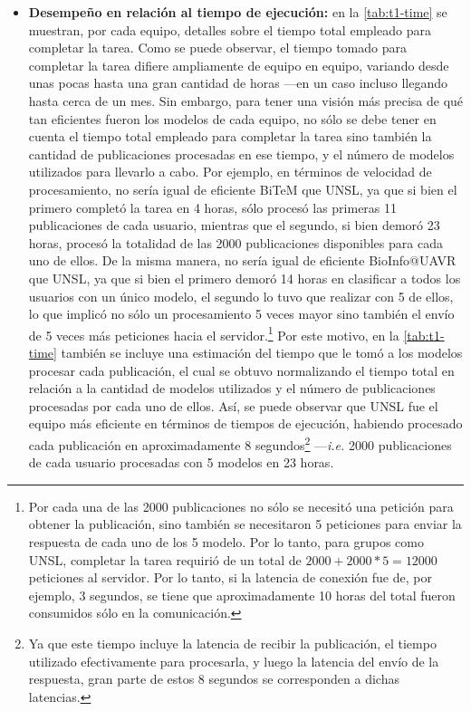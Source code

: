 \begin{itemize}
\begin{table}[t!]
\begin{tabular}{l c c|c | c}
\hline
\end{tabular}
\end{table}

    \item \textbf{Desempeño en relación al tiempo de ejecución:} en la \autoref{tab:t1-time} se muestran, por cada equipo, detalles sobre el tiempo total empleado para completar la tarea.
    Como se puede observar, el tiempo tomado para completar la tarea difiere ampliamente de equipo en equipo, variando desde unas pocas hasta una gran cantidad de horas ---en un caso incluso llegando hasta cerca de un mes.
    Sin embargo, para tener una visión más precisa de qué tan eficientes fueron los modelos de cada equipo, no sólo se debe tener en cuenta el tiempo total empleado para completar la tarea sino también la cantidad de publicaciones procesadas en ese tiempo, y el número de modelos utilizados para llevarlo a cabo.
    Por ejemplo, en términos de velocidad de procesamiento, no sería igual de eficiente BiTeM que UNSL, ya que si bien el primero completó la tarea en 4 horas, sólo procesó las primeras 11 publicaciones de cada usuario, mientras que el segundo, si bien demoró 23 horas, procesó la totalidad de las 2000 publicaciones disponibles para cada uno de ellos.
    De la misma manera, no sería igual de eficiente BioInfo@UAVR que UNSL, ya que si bien el primero demoró 14 horas en clasificar a todos los usuarios con un único modelo, el segundo lo tuvo que realizar con 5 de ellos, lo que implicó no sólo un procesamiento 5 veces mayor sino también el envío de 5 veces más peticiones hacia el servidor.\footnote{Por cada una de las 2000 publicaciones no sólo se necesitó una petición para obtener la publicación, sino también se necesitaron 5 peticiones para enviar la respuesta de cada uno de los 5 modelo. Por lo tanto, para grupos como UNSL, completar la tarea requirió de un total de $2000 + 2000*5 = 12000$ peticiones al servidor. Por lo tanto, si la latencia de conexión fue de, por ejemplo, 3 segundos, se tiene que aproximadamente 10 horas del total fueron consumidos sólo en la comunicación.}
    Por este motivo, en la \autoref{tab:t1-time} también se incluye una estimación del tiempo que le tomó a los modelos procesar cada publicación, el cual se obtuvo normalizando el tiempo total en relación a la cantidad de modelos utilizados y el número de publicaciones procesadas por cada uno de ellos.
    Así, se puede observar que UNSL fue el equipo más eficiente en términos de tiempos de ejecución, habiendo procesado cada publicación en aproximadamente 8 segundos\footnote{Ya que este tiempo incluye la latencia de recibir la publicación, el tiempo utilizado efectivamente para procesarla, y luego la latencia del envío de la respuesta, gran parte de estos 8 segundos se corresponden a dichas latencias.} ---\emph{i.e.} 2000 publicaciones de cada usuario procesadas con 5 modelos en 23 horas.

\end{itemize}
